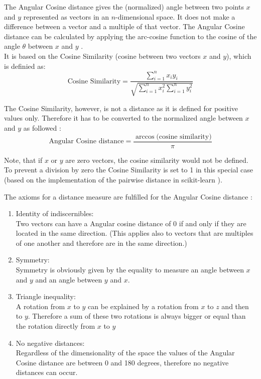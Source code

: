 
The Angular Cosine distance gives the (normalized) angle between two points $x$ and $y$ represented as vectors in an $n$-dimensional space. It does not make a difference between a vector and a multiple of that vector. The Angular Cosine distance can be calculated by applying the arc-cosine function to the cosine of the angle $\theta$ between $x$ and $y$ \cite{MMDS}. \\
It is based on the Cosine Similarity (cosine between two vectors $x$ and $y$), which is definied as: \\

\begin{equation}
	\text{Cosine Similarity} = \frac{\sum_{i=1}^{n} x_i y_i}{\sqrt{\sum_{i=1}^{n} x_i^2 \sum_{i=1}^{n} y_i^2}}
\end{equation}  

The Cosine Similarity, however, is not a distance as it is defined for positive values only. Therefore it has to be converted to the normalized angle between $x$ and $y$ as followed \cite{cosdist}: \\

\begin{equation}
	\text{Angular Cosine distance} = \frac{\arccos({\text{cosine similarity})}}{\pi}
\end{equation}  

Note, that if $x$ or $y$ are zero vectors, the cosine similarity would not be defined. To prevent a division by zero the Cosine Similarity is set to 1 in this special case (based on the implementation of the pairwise distance in scikit-learn \cite{scikitlearn}). 

The axioms for a distance measure are fulfilled for the Angular Cosine distance \cite{MMDS}: \\

\begin{enumerate}
	\item Identity of indiscernibles:\\
	Two vectors can have a Angular cosine distance of 0 if and only if they are located in the same direction. (This applies also to vectors that are multiples of one another and therefore are in the same direction.) 
	\item Symmetry: \\
	Symmetry is obviously given by the equality to measure an angle between $x$ and $y$ and an angle between $y$ and $x$. 
	\item Triangle inequality: \\
	A rotation from $x$ to $y$ can be explained by a rotation from $x$ to $z$ and then to $y$. Therefore a sum of these two rotations is always bigger or equal than the rotation directly from $x$ to $y$ 
	\item No negative distances:\\
	Regardless of the dimensionality of the space the values of the Angular Cosine distance are between 0 and 180 degrees, therefore no negative distances can occur. 
	
\end{enumerate}

